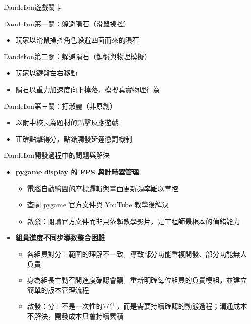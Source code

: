 \documentclass{article}
\begin{document}
\begin{large}
\begin{boxpar}{Dandelion}{遊戲關卡}
    \begin{boxpar}{Dandelion}{第一關：躲避隕石（滑鼠操控）}
        \begin{itemize}
            \item 玩家以滑鼠操控角色躲避四面而來的隕石
        \end{itemize}
    \end{boxpar}
    \begin{boxpar}{Dandelion}{第二關：躲避隕石（鍵盤與物理模擬）}
        \begin{itemize}
            \item 玩家以鍵盤左右移動
            \item 隕石以重力加速度向下掉落，模擬真實物理行為
        \end{itemize}
    \end{boxpar}
    \begin{boxpar}{Dandelion}{第三關：打淑麗（非原創）}
        \begin{itemize}
            \item 以附中校長為題材的點擊反應遊戲
            \item 正確點擊得分，點錯觸發延遲懲罰機制
        \end{itemize}
    \end{boxpar}
\end{boxpar}

\begin{boxpar}{Dandelion}{開發過程中的問題與解決}
\begin{itemize}
    \item \textbf{pygame.display 的 FPS 與計時器管理}
        \begin{itemize}
            \item 電腦自動繪圖的座標邏輯與畫面更新頻率難以掌控
            \item 查閱 pygame 官方文件與 YouTube 教學後解決
            \item 啟發：閱讀官方文件而非只依賴教學影片，是工程師最根本的偵錯能力
        \end{itemize}
    \item \textbf{組員進度不同步導致整合困難}
        \begin{itemize}
            \item 各組員對分工範圍的理解不一致，導致部分功能重複開發、部分功能無人負責
            \item 身為組長主動召開進度確認會議，重新明確每位組員的負責模組，並建立簡單的版本管理流程
            \item 啟發：分工不是一次性的宣告，而是需要持續確認的動態過程；溝通成本不解決，開發成本只會持續累積
        \end{itemize}
\end{itemize}
\end{boxpar}


\end{large}
\end{document}
